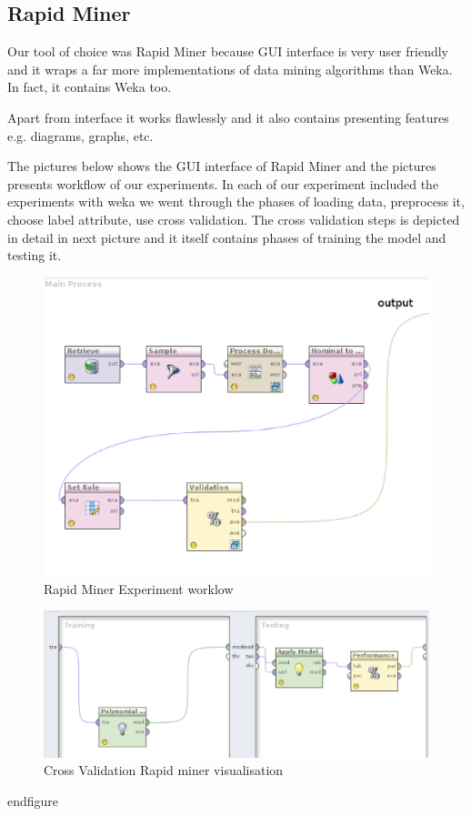 \subsection{Rapid Miner} %
\label{sub:Rapid Miner}
Our tool of choice was Rapid Miner because 
 GUI interface is very user friendly and it wraps a far more 
implementations of data mining algorithms than Weka. In fact, it contains Weka too.

    Apart from interface it works flawlessly and it also contains presenting features e.g. diagrams, graphs, etc.

The pictures below shows the GUI interface of Rapid Miner
and the pictures presents workflow of our experiments.
In each of our experiment included the experiments with weka we went through the phases of loading data, preprocess it, choose label attribute, use cross validation. The cross validation steps is depicted in detail in next picture and it itself contains phases of training the model and testing it.

\begin{figure}[!hbp]
\begin{center}
    \includegraphics[scale=0.5]{rapidMiner-process}
\caption{\label{pic:st_art}  Rapid Miner Experiment worklow}
\end{center}
\end{figure}

\begin{figure}[!hbp]
\begin{center}
    \includegraphics[scale=0.5]{rapidMiner-process-validation}
\caption{\label{pic:st_art}  Cross Validation Rapid miner visualisation}
\end{center}
\end{figure}

end{figure}

